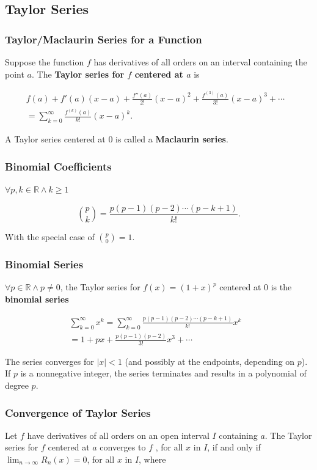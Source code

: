\subsection{Taylor Series}
\subsubsection{Taylor/Maclaurin Series for a Function}
Suppose the function $f$ has derivatives of all orders on an interval containing the point $a$. The \textbf{Taylor series for $f$ centered at $a$} is

\begin{align}
    f(a) + f'(a)(x - a) + \frac{f''(a)}{2!}(x - a)^2 + \frac{f^{(3)}(a)}{3!}(x - a)^3 + \cdots & \\ = \sum ^{\infty} _{k = 0} \frac{f^{(k)}(a)}{k!}(x - a)^k.
\end{align}

A Taylor series centered at $0$ is called a \textbf{Maclaurin series}.

\subsubsection{Binomial Coefficients}
$\forall p, k \in \mathbb{R} \wedge k \geq 1$

\begin{equation}
    \binom{p}{k} = \frac{p(p - 1)(p - 2)\cdots(p - k + 1)}{k!}.
\end{equation}

With the special case of $\binom{p}{0} = 1$.

\subsubsection{Binomial Series}
$\forall p \in \mathbb{R} \wedge p \neq 0$, the Taylor series for $f(x) = (1 + x)^p$ centered at 0 is the \textbf{binomial series}

\begin{align}
    \sum _{k = 0} ^{\infty} x^k = \sum _{k = 0} ^{\infty} \frac{p(p - 1)(p - 2)\cdots(p - k + 1)}{k!} x^k & \\ = 1 + px +\frac{p(p - 1)(p - 2)}{3!}x^3 + \cdots
\end{align}

The series converges for $|x| < 1$ (and possibly at the endpoints, depending on $p$). If $p$ is a nonnegative integer, the series terminates and results in a polynomial of degree $p$.

\subsubsection{Convergence of Taylor Series}
Let $f$ have derivatives of all orders on an open interval $I$ containing $a$. The Taylor series for $f$ centered at $a$ converges to $f$ , for all $x$ in $I$, if and only if $\lim _{n \rightarrow \infty} R_n (x) = 0$, for all $x$ in $I$, where

